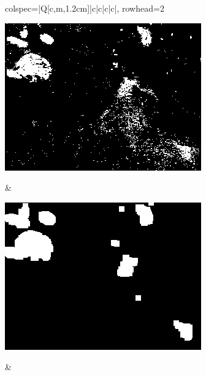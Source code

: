 \begin{longtblr}[
            caption = {Hasil uji coba proses \textit{background subtraction} menggunakan GMM yang disempurnakan oleh Operasi Morfologi},
            label = {tab:gmm_morph_9908}
        ]{
            colspec={|Q[c,m,1.2cm]|c|c|c|c|},
            rowhead=2
        }
\begin{minipage}{0.19\textwidth}
                \includegraphics[width=\linewidth]{image/gt_116/gt_116_gmm_frame803.jpg}
            \end{minipage} & 
            \begin{minipage}{0.19\textwidth}
                \includegraphics[width=\linewidth]{image/gt_116/gt_116_dilated_3x9_frame803.jpg}
            \end{minipage} &
            \begin{minipage}{0.19\textwidth}

\end{minipage}
\end{longtblr}
